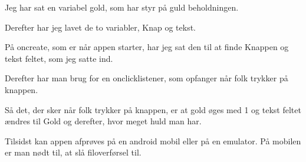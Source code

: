 Jeg har sat en variabel gold, som har styr på guld beholdningen. 

Derefter har jeg lavet de to variabler, Knap og tekst. 

På oncreate, som er når appen starter, har jeg sat den til at finde Knappen og tekst feltet, som jeg satte ind. 

Derefter har man brug for en onclicklistener, som opfanger når folk trykker på knappen. 

Så det, der sker når folk trykker på knappen, er at gold øges med 1 og tekst feltet ændres til Gold og derefter, hvor meget huld man har. 

Tilsidst kan appen afprøves på en android mobil eller på en emulator. På mobilen er man nødt til,   at slå filoverførsel til. 






